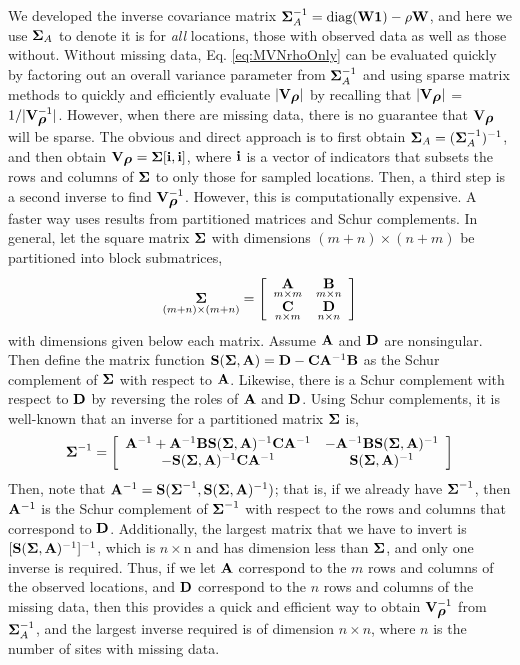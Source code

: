 \documentclass[11pt, titlepage]{article}\usepackage[]{graphicx}\usepackage[]{color}
\begin{document}
\begin{spacing}{1.9}
\begin{flushleft}
We developed the inverse covariance matrix $\mbox{\boldmath $\Sigma$}_A^{-1} = \textrm{diag}(\mathbf{W}\mathbf{1}) - \rho\mathbf{W}$, and here we use $\mbox{\boldmath $\Sigma$}_A$ to denote it is for \emph{all} locations, those with observed data as well as those without. Without missing data, Eq. \ref{eq:MVNrhoOnly} can be evaluated quickly by factoring out an overall variance parameter from $\mbox{\boldmath $\Sigma$}_A^{-1}$ and using sparse matrix methods to quickly and efficiently evaluate $|\mathbf{V}_{\mbox{\boldmath $\rho$}}|$ by recalling that $|\mathbf{V}_{\mbox{\boldmath $\rho$}}|$ = $1/|\mathbf{V}^{-1}_{\mbox{\boldmath $\rho$}}|$.  However, when there are missing data, there is no guarantee that $\mathbf{V}_{\mbox{\boldmath $\rho$}}$ will be sparse.  The obvious and direct approach is to first obtain $\mbox{\boldmath $\Sigma$}_A = (\mbox{\boldmath $\Sigma$}_A^{-1})^{-1}$, and then obtain $\mathbf{V}_{\mbox{\boldmath $\rho$}} = \mbox{\boldmath $\Sigma$}[\mathbf{i},\mathbf{i}]$, where $\mathbf{i}$ is a vector of indicators that subsets the rows and columns of $\mbox{\boldmath $\Sigma$}$ to only those for sampled locations.  Then, a third step is a second inverse to find $\mathbf{V}_{\mbox{\boldmath $\rho$}}^{-1}$.  However, this is computationally expensive.  A faster way uses results from partitioned matrices and Schur complements.  In general, let the square matrix $\mbox{\boldmath $\Sigma$}$ with dimensions $(m + n) \times (n + m)$ be partitioned into block submatrices,
\[
  \underset{(m+n) \times (m+n)}{\mbox{\boldmath $\Sigma$}} = \left[
    \begin{array}{cc}
	    \underset{m \times m}{\mathbf{A}} & \underset{m \times n}{\mathbf{B}} \\
	    \underset{n \times m}{\mathbf{C}} & \underset{n \times n}{\mathbf{D}}
    \end{array}
  \right]
\]
with dimensions given below each matrix. Assume $\mathbf{A}$ and $\mathbf{D}$ are nonsingular.  Then define the matrix function $\mathbf{S}(\mbox{\boldmath $\Sigma$},\mathbf{A}) = \mathbf{D} - \mathbf{C}\mathbf{A}^{-1}\mathbf{B}$ as the Schur complement of $\mbox{\boldmath $\Sigma$}$ with respect to $\mathbf{A}$.  Likewise, there is a Schur complement with respect to $\mathbf{D}$ by reversing the roles of $\mathbf{A}$ and $\mathbf{D}$.  Using Schur complements, it is well-known \citep[e.g.,][p. 97]{Harv:matr:1997} that an inverse for a partitioned matrix $\mbox{\boldmath $\Sigma$}$ is,
\[
  \mbox{\boldmath $\Sigma$}^{-1} = \left[
    \begin{array}{cc}
      \mathbf{A}^{-1} + \mathbf{A}^{-1}\mathbf{B}\mathbf{S}(\mbox{\boldmath $\Sigma$},\mathbf{A})^{-1}\mathbf{C}\mathbf{A}^{-1} & -\mathbf{A}^{-1}\mathbf{B}\mathbf{S}(\mbox{\boldmath $\Sigma$},\mathbf{A})^{-1} \\
      -\mathbf{S}(\mbox{\boldmath $\Sigma$},\mathbf{A})^{-1}\mathbf{C}\mathbf{A}^{-1} & \mathbf{S}(\mbox{\boldmath $\Sigma$},\mathbf{A})^{-1}
    \end{array}
  \right]
\]
Then, note that $\mathbf{A}^{-1} = \mathbf{S}(\mbox{\boldmath $\Sigma$}^{-1}, \mathbf{S}(\mbox{\boldmath $\Sigma$},\mathbf{A})^{-1})$; that is, if we already have $\mbox{\boldmath $\Sigma$}^{-1}$, then $\mathbf{A}^{-1}$ is the Schur complement of $\mbox{\boldmath $\Sigma$}^{-1}$ with respect to the rows and columns that correspond to $\mathbf{D}$.  Additionally, the largest matrix that we have to invert is $[\mathbf{S}(\mbox{\boldmath $\Sigma$},\mathbf{A})^{-1}]^{-1}$, which is $n \times $n and has dimension less than $\mbox{\boldmath $\Sigma$}$, and only one inverse is required. Thus, if we let $\mathbf{A}$ correspond to the $m$ rows and columns of the observed locations, and $\mathbf{D}$ correspond to the $n$ rows and columns of the missing data, then this provides a quick and efficient way to obtain $\mathbf{V}_{\mbox{\boldmath $\rho$}}^{-1}$ from $\mbox{\boldmath $\Sigma$}_A^{-1}$, and the largest inverse required is of dimension $n \times n$, where $n$ is the number of sites with missing data.


\end{flushleft}
\end{spacing}
\end{document}
